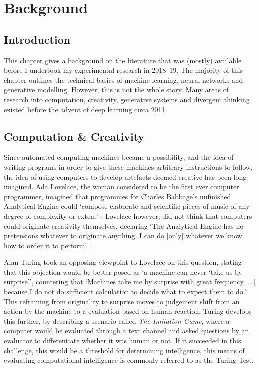 \chapter{Background}
\label{ch:background}

\section{Introduction}

This chapter gives a background on the literature that was (mostly) available before I undertook my experimental research in 2018~19. 
The majority of this chapter outlines the technical basics of machine learning, neural networks and generative modelling. 
However, this is not the whole story. Many areas of research into computation, creativity, generative systems and divergent thinking existed before the advent of deep learning circa 2011. 

\section{Computation \& Creativity}

Since automated computing machines became a possibility, and the idea of writing programs in order to give these machines arbitrary instructions to follow, the idea of using computers to develop artefacts deemed creative has been long imagined. 
Ada Lovelace, the woman considered to be the first ever computer programmer, imagined that programmes for Charles Babbage's unfinished Analytical Engine could ‘compose elaborate and scientific pieces of music of any degree of complexity or extent’ .
Lovelace however, did not think that computers could originate creativity themselves, declaring ‘The Analytical Engine has no pretensions whatever to originate anything. I can do [only] whatever we know how to order it to perform’. \citep{lovelace1843notes}.

Alan Turing took an opposing viewpoint to Lovelace on this question, stating that this objection would be better posed as ‘a machine can never ‘take us by surprise’’, countering that ‘Machines take me by surprise with great frequency [...] because I do not do sufficient calculation to decide what to expect them to do.’  \citep{machinery1950computing}
This reframing from originality to surprise moves to judgement shift from an action by the machine to a evaluation based on human reaction. 
Turing develops this further, by describing a scenario called \textit{The Imitation Game}, where a computer would be evaluated through a text channel and asked questions by an evaluator to differentiate whether it was human or not. 
If it succeeded in this challenge, this would be a threshold for determining intelligence,
this means of evaluating computational intelligence is commonly referred to as the Turing Test. 

